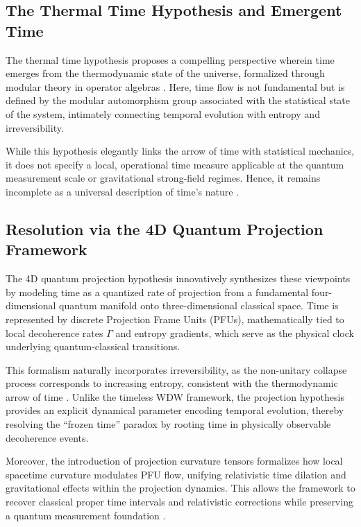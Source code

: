 \documentclass[12pt,a4paper]{article}
\numberwithin{equation}{section}
\begin{document}
\subsection{The Thermal Time Hypothesis and Emergent Time}

The thermal time hypothesis proposes a compelling perspective wherein time emerges from the thermodynamic state of the universe, formalized through modular theory in operator algebras \cite{connes_thermal_1994}. Here, time flow is not fundamental but is defined by the modular automorphism group associated with the statistical state of the system, intimately connecting temporal evolution with entropy and irreversibility.

While this hypothesis elegantly links the arrow of time with statistical mechanics, it does not specify a local, operational time measure applicable at the quantum measurement scale or gravitational strong-field regimes. Hence, it remains incomplete as a universal description of time’s nature \cite{rovelli_time_2004}.

\subsection{Resolution via the 4D Quantum Projection Framework}

The 4D quantum projection hypothesis innovatively synthesizes these viewpoints by modeling time as a quantized rate of projection from a fundamental four-dimensional quantum manifold onto three-dimensional classical space. Time is represented by discrete Projection Frame Units (PFUs), mathematically tied to local decoherence rates \( \Gamma \) and entropy gradients, which serve as the physical clock underlying quantum-classical transitions.

This formalism naturally incorporates irreversibility, as the non-unitary collapse process corresponds to increasing entropy, consistent with the thermodynamic arrow of time \cite{zurek_decoherence_2003}. Unlike the timeless WDW framework, the projection hypothesis provides an explicit dynamical parameter encoding temporal evolution, thereby resolving the “frozen time” paradox by rooting time in physically observable decoherence events.

Moreover, the introduction of projection curvature tensors formalizes how local spacetime curvature modulates PFU flow, unifying relativistic time dilation and gravitational effects within the projection dynamics. This allows the framework to recover classical proper time intervals and relativistic corrections while preserving a quantum measurement foundation \cite{misner_gravitation_1973}.
\end{document}
